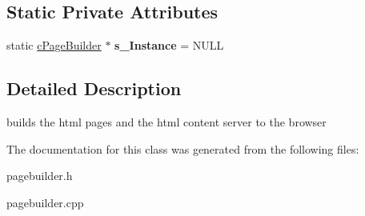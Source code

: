 \subsection*{Static Private Attributes}
\begin{DoxyCompactItemize}
\item 
\hypertarget{classhttp__server_1_1cPageBuilder_a5857987a8133c3768bac833850d12613}{static \hyperlink{classhttp__server_1_1cPageBuilder}{c\-Page\-Builder} $\ast$ {\bfseries s\-\_\-\-Instance} = N\-U\-L\-L}\label{classhttp__server_1_1cPageBuilder_a5857987a8133c3768bac833850d12613}

\end{DoxyCompactItemize}


\subsection{Detailed Description}
builds the html pages and the html content server to the browser 

The documentation for this class was generated from the following files\-:\begin{DoxyCompactItemize}
\item 
pagebuilder.\-h\item 
pagebuilder.\-cpp\end{DoxyCompactItemize}
